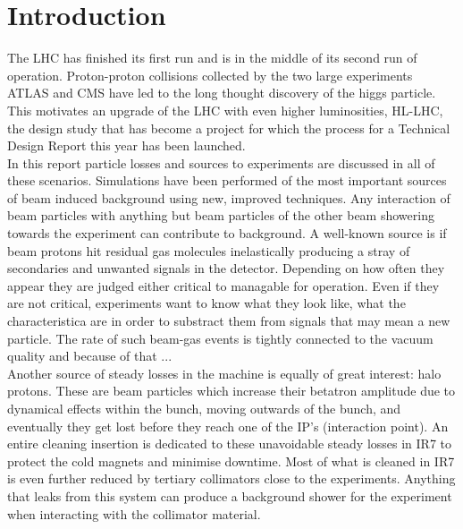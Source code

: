 \section{Introduction}


The LHC has finished its first run and is in the middle of its second run of operation. Proton-proton collisions collected by the two large experiments ATLAS and CMS have led to the long thought discovery of the higgs particle. This motivates an upgrade of the LHC with even higher luminosities, HL-LHC, the design study that has become a project for which the process for a Technical Design Report this year has been launched. \\

In this report particle losses and sources to experiments are discussed in all of these scenarios. Simulations have been performed of the most important sources of beam induced background using new, improved techniques. Any interaction of beam particles with anything but beam particles of the other beam showering towards the experiment can contribute to background. A well-known source is if beam protons hit residual gas molecules inelastically producing a stray of secondaries and unwanted signals in the detector. Depending on how often they appear they are judged either critical to managable for operation. Even if they are not critical, experiments want to know what they look like, what the characteristica are in order to substract them from signals that may mean a new particle. The rate of such beam-gas events is tightly connected to the vacuum quality and because of that ... \\

Another source of steady losses in the machine is equally of great interest: halo protons. These are beam particles which increase their betatron amplitude due to dynamical effects within the bunch, moving outwards of the bunch, and eventually they get lost before they reach one of the IP's (interaction point). An entire cleaning insertion is dedicated to these unavoidable steady losses in IR7 to protect the cold magnets and minimise downtime. Most of what is cleaned in IR7 is even further reduced by tertiary collimators close to the experiments. Anything that leaks from this system can produce a background shower for the experiment when interacting with the collimator material. 

